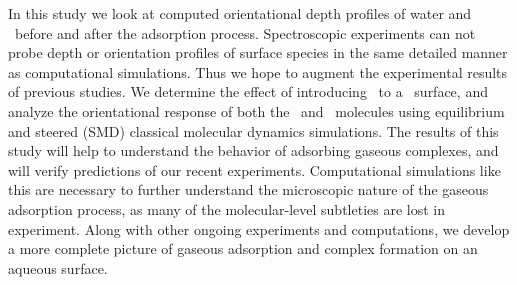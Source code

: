 In this study we look at computed orientational depth profiles of water and \suldiox~before and after the adsorption process. Spectroscopic experiments can not probe depth or orientation profiles of surface species in the same detailed manner as computational simulations. Thus we hope to augment the experimental results of previous studies. We determine the effect of introducing \suldiox~to a \wat~surface, and analyze the orientational response of both the \suldiox~and \wat~molecules using equilibrium and steered (SMD) classical molecular dynamics simulations. The results of this study will help to understand the behavior of adsorbing gaseous complexes, and will verify predictions of our recent experiments. Computational simulations like this are necessary to further understand the microscopic nature of the gaseous adsorption process, as many of the molecular-level subtleties are lost in experiment. Along with other ongoing experiments and computations, we develop a more complete picture of gaseous adsorption and complex formation on an aqueous surface.
